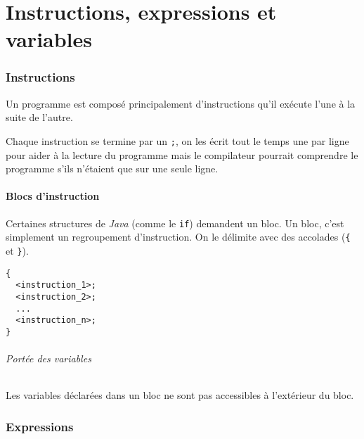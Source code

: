 

\usepackage{color}
\usepackage[usenames,dvipsnames,svgnames,table]{xcolor}

\usepackage{listings}



\newcommand{\java}{\emph{Java}}

\part{Instructions, expressions et variables}

\section{Instructions}
Un programme est composé principalement d'instructions qu'il exécute l'une à la
suite de l'autre.

Chaque instruction se termine par un \verb|;|, on les écrit tout le temps
une par ligne pour aider à la lecture du programme mais le compilateur
pourrait comprendre le programme s'ils n'étaient que sur une seule ligne.

\subsection{Blocs d'instruction}
Certaines structures de \java{} (comme le \verb|if|) demandent un bloc.
Un bloc, c'est simplement un regroupement d'instruction.
On le délimite avec des accolades
(\verb|{| et \verb|}|).
\begin{lstlisting}
{
  <instruction_1>;
  <instruction_2>;
  ...
  <instruction_n>;
}
\end{lstlisting}

\paragraph{Portée des variables}
Les variables déclarées dans un bloc ne sont pas accessibles à l'extérieur
du bloc.

\section{Expressions}


